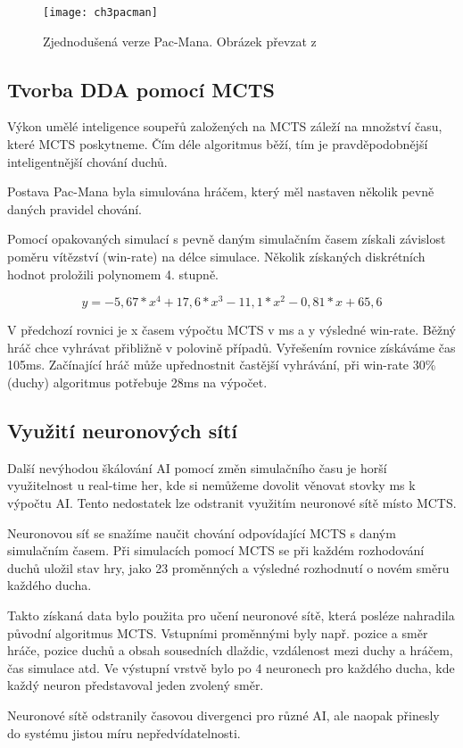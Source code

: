 \begin{figure}
  \centering
  \texttt{[image: ch3pacman]}
	\caption{Zjednodušená verze Pac-Mana. Obrázek převzat z \cite{18Pac1}}
	\label{fig:ch3pacman}
\end{figure}

\subsection{Tvorba DDA pomocí MCTS}

Výkon umělé inteligence soupeřů založených na MCTS záleží na množství času, které MCTS poskytneme. Čím déle algoritmus běží, tím je pravděpodobnější inteligentnější chování duchů.

Postava Pac-Mana byla simulována hráčem, který měl nastaven několik pevně daných pravidel chování.

Pomocí opakovaných simulací s pevně daným simulačním časem získali závislost poměru vítězství (win-rate) na délce simulace. Několik získaných diskrétních hodnot proložili polynomem 4. stupně.

\begin{equation}
	y=-5,67*x^4+17,6*x^3-11,1*x^2-0,81*x+65,6
\end{equation}

V předchozí rovnici je x časem výpočtu MCTS v ms a y výsledné win-rate.
Běžný hráč chce vyhrávat přibližně v polovině případů. Vyřešením rovnice získáváme čas 105ms. Začínající hráč může upřednostnit častější vyhrávání, při win-rate 30\% (duchy) algoritmus potřebuje 28ms na výpočet.

\subsection{Využití neuronových sítí}
Další nevýhodou škálování AI pomocí změn simulačního času je horší využitelnost u real-time her, kde si nemůžeme dovolit věnovat stovky ms k výpočtu AI. Tento nedostatek lze odstranit využitím neuronové sítě místo MCTS.

Neuronovou síť se snažíme naučit chování odpovídající MCTS s daným simulačním časem. Při simulacích pomocí MCTS se při každém rozhodování duchů uložil stav hry, jako 23 proměnných a výsledné rozhodnutí o novém směru každého ducha.

Takto získaná data bylo použita pro učení neuronové sítě, která posléze nahradila původní algoritmus MCTS. Vstupními proměnnými byly např. pozice a směr hráče, pozice duchů a obsah sousedních dlaždic, vzdálenost mezi duchy a hráčem, čas simulace atd. Ve výstupní vrstvě bylo po 4 neuronech pro každého ducha, kde každý neuron představoval jeden zvolený směr.

Neuronové sítě odstranily časovou divergenci pro různé AI, ale naopak přinesly do systému jistou míru nepředvídatelnosti.
